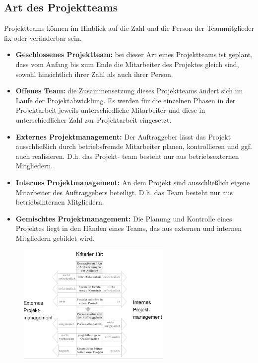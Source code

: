 \documentclass[11pt,a4paper]{article}
\begin{document}
\subsection{Art des Projektteams}
Projektteams können im Hinblick auf die Zahl und die
Person der Teammitglieder fix oder veränderbar sein.

\begin{itemize}
\item \textbf{Geschlossenes Projektteam:} bei dieser Art eines Projektteams ist geplant, dass vom Anfang bis zum
Ende die Mitarbeiter des Projektes gleich sind, sowohl hinsichtlich ihrer
Zahl als auch ihrer Person.

\item \textbf{Offenes Team:} die Zusammensetzung dieses Projektteams ändert sich im Laufe der
Projektabwicklung. Es werden für die einzelnen Phasen in der Projektarbeit
jeweils unterschiedliche Mitarbeiter und diese in unterschiedlicher Zahl
zur Projektarbeit eingesetzt.

\item \textbf{Externes Projektmanagement:} Der Auftraggeber lässt das Projekt ausschließlich durch betriebsfremde
Mitarbeiter planen, kontrollieren und ggf. auch realisieren. D.h. das Projekt-
team besteht nur aus betriebsexternen Mitgliedern.

\item \textbf{Internes Projektmanagement:} An dem Projekt sind ausschließlich eigene Mitarbeiter des Auftraggebers
beteiligt. D.h. das Team besteht nur aus betriebsinternen Mitgliedern.

\item \textbf{Gemischtes Projektmanagement:} Die Planung und Kontrolle eines Projektes liegt in den Händen eines Teams,
das aus externen und internen Mitgliedern gebildet wird.
\end{itemize}

\begin{figure}[H]
	\centering

	\includegraphics[width=0.66\textwidth]{ch5/kriterien}

\end{figure}	
\end{document}

